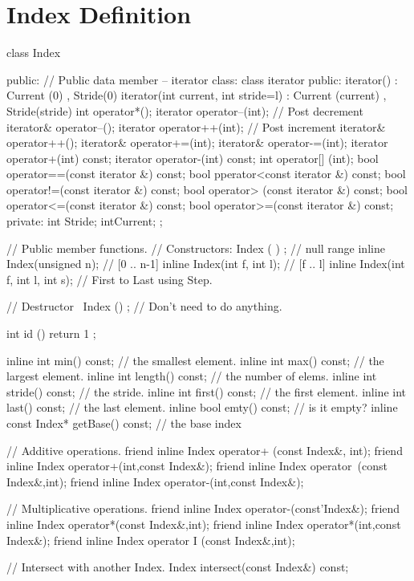 \section{Index Definition}
\label{sec:indpubldef}
\begin{smallcode}
class Index { 
public: 
// Public data member -- iterator class: class iterator 
{ 
public:
iterator() : Current (0) , Stride(0) {} 
iterator(int current, int stride=l) : Current (current) , Stride(stride){} 
int operator*(); 
iterator operator--(int); // Post decrement iterator& operator--(); 
iterator operator++(int); // Post increment iterator& operator++(); 
iterator& operator+=(int); 
iterator& operator-=(int); 
iterator operator+(int) const; 
iterator operator-(int) const; 
int operator[] (int); 
bool operator==(const iterator &) const; 
bool pperator<const iterator &) const; 
bool operator!=(const iterator &) const; 
bool operator> (const iterator &) const; 
bool operator<=(const iterator &) const; 
bool operator>=(const iterator &) const; 
private: 
int Stride; 
intCurrent; 
};

// Public member functions. 
// Constructors: 
Index ( ) ;                                  // null range
inline Index(unsigned n);      // [0 .. n-1]  
inline Index(int f, int l);         // [f .. l] 
inline Index(int f, int l, int s); // First to Last using Step. 

// Destructor 
~Index () {};         // Don't need to do anything. 

int id () { return 1 ; }
 
inline int min() const;		// the smallest element.
inline int max() const;	// the largest element.
inline int length() const; 	// the number of elems.
inline int stride() const; 	// the stride. 
inline int first() const; 	// the first element. 
inline int last() const; 	// the last element.
inline bool emty() const;	 // is it empty? 
inline const Index* getBase() const; // the base index 
 
// Additive operations. 
friend inline Index operator+ (const Index&, int);
friend inline Index operator+(int,const Index&);
friend inline Index operator~(const Index&,int);
friend inline Index operator-(int,const Index&);

// Multiplicative operations. 
friend inline Index operator-(const'Index&);
friend inline Index operator*(const Index&,int);
friend inline Index operator*(int,const Index&); 
friend inline Index operator I (const Index&,int);

// Intersect with another Index. 
Index intersect(const Index&) const;

}
\end{smallcode}
